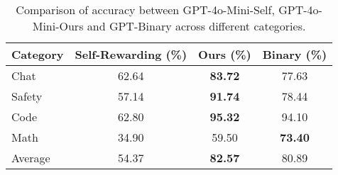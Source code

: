 \begin{table*}[h]
    \centering
    \begin{tabular}{lccc}
        \hline
        \textbf{Category} & \textbf{Self-Rewarding (\%)} & \textbf{Ours (\%)} & \textbf{Binary (\%)}\\
        \hline
        Chat   & 62.64 & \textbf{83.72} & 77.63\\
        Safety & 57.14 & \textbf{91.74} & 78.44\\
        Code   & 62.80 & \textbf{95.32} & 94.10\\
        Math   & 34.90 & 59.50 & \textbf{73.40}\\
        \hline
        Average & 54.37 & \textbf{82.57} & 80.89\\
        \hline
    \end{tabular}
    \caption{Comparison of accuracy between GPT-4o-Mini-Self, GPT-4o-Mini-Ours and GPT-Binary across different categories.}
    \label{accuracy_gpt}
\end{table*}